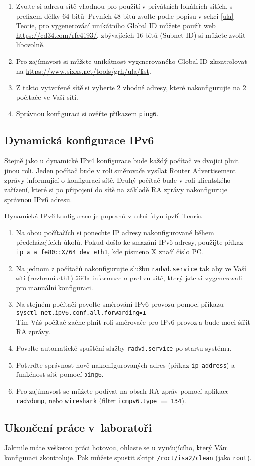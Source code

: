 \begin{enumerate}
    \item Zvolte si adresu sítě vhodnou pro použití v privátních lokálních
        sítích, s prefixem délky 64 bitů. Prvních 48 bitů zvolte podle popisu v
        sekci \ref{ula} Teorie, pro vygenerování unikátního Global ID můžete
        použít web \url{https://cd34.com/rfc4193/}, zbývajících 16 bitů (Subnet
        ID) si můžete zvolit libovolně.
    \item Pro zajímavost si můžete unikátnost vygenerovaného Global ID
        zkontrolovat na \url{https://www.sixxs.net/tools/grh/ula/list}.
    \item Z takto vytvořené sítě si vyberte 2 vhodné adresy, které
        nakonfigurujte na 2 počítače ve Vaší síti.
    \item Správnou konfiguraci si ověřte příkazem {\tt ping6}.
\end{enumerate}

\subsection{Dynamická konfigurace IPv6}
Stejně jako u dynamické IPv4 konfigurace bude každý počítač ve dvojici plnit
jinou roli. Jeden počítač bude v roli směrovače vysílat Router Advertisement
zprávy informující o konfiguraci sítě. Druhý počítač bude v roli klientského
zařízení, které si po připojení do sítě na základě RA zprávy nakonfiguruje
správnou IPv6 adresu.

Dynamická IPv6 konfigurace je popsaná v sekci \ref{dyn-ipv6} Teorie.

\begin{enumerate}
    \item Na obou počítačích si ponechte IP adresy nakonfigurované během
        předcházejících úkolů. Pokud došlo ke smazání IPv6 adresy, použijte příkaz \texttt{ip a a fe80::X/64 dev eth1}, kde písmeno X značí číslo PC.
    \item Na jednom z počítačů nakonfigurujte službu \texttt{radvd.service} tak
        aby ve Vaší síti (rozhraní eth1) šířila informace o prefixu sítě, který
        jste si vygenerovali pro manuální konfiguraci.
    \item Na stejném počítači povolte směrování IPv6 provozu pomocí příkazu\\
        \texttt{sysctl net.ipv6.conf.all.forwarding=1}\\
        Tím Váš počítač začne plnit roli směrovače pro IPv6 provoz a bude moci
        šířit RA zprávy.
    \item Povolte automatické spuštění služby \texttt{radvd.service} po startu systému.
    \item Potvrďte správnost nově nakonfigurovaných adres (příkaz \texttt{ip
        address}) a funkčnost sítě pomocí \texttt{ping6}.
    \item Pro zajímavost se můžete podívat na obsah RA zpráv pomocí aplikace
        \texttt{radvdump}, nebo \texttt{wireshark} (filter \texttt{icmpv6.type
        == 134}).
\end{enumerate}

\subsection{Ukončení práce v~laboratoři}
Jakmile máte veškerou práci hotovou, ohlaste se u vyučujícího, který Vám
konfiguraci zkontroluje. Pak můžete spustit skript {\tt /root/isa2/clean} (jako
\texttt{root}).
